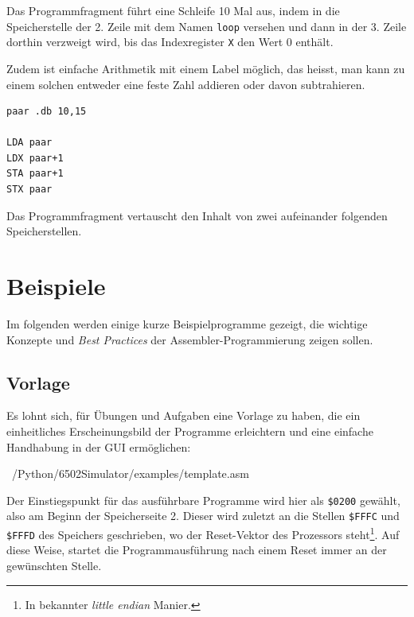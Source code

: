\documentclass[11pt]{scrartcl}
\newcommand{\hex}[1]{\texttt{\$#1}}
\begin{document}
\begin{center}
  
\end{center}

Das Programmfragment führt eine Schleife 10 Mal aus, indem in die
Speicherstelle der 2. Zeile mit dem Namen \lstinline!loop! versehen
und dann in der 3. Zeile dorthin verzweigt wird, bis das Indexregister
\lstinline!X! den Wert 0 enthält.

Zudem ist einfache Arithmetik mit einem Label möglich, das heisst, man
kann zu einem solchen entweder eine feste Zahl addieren oder davon
subtrahieren.


\begin{center}
\begin{lstlisting}[caption={Assembler, Beispiel 3}, label=asmbeisp3]
paar .db 10,15

LDA paar
LDX paar+1
STA paar+1
STX paar
\end{lstlisting}
\end{center}

Das Programmfragment vertauscht den Inhalt von zwei aufeinander
folgenden Speicherstellen.

\newpage
\section{Beispiele}
\label{sec:beispiele}

Im folgenden werden einige kurze Beispielprogramme gezeigt, die
wichtige Konzepte und \emph{Best Practices} der
Assembler-Programmierung zeigen sollen.

\subsection{Vorlage}
\label{sec:vorlage}

Es lohnt sich, für Übungen und Aufgaben eine Vorlage zu haben, die
ein einheitliches Erscheinungsbild der Programme erleichtern und eine
einfache Handhabung in der GUI ermöglichen:


{~/Python/6502Simulator/examples/template.asm}

Der Einstiegspunkt für das ausführbare Programme wird hier als
\hex{0200} gewählt, also am Beginn der Speicherseite 2. Dieser wird
zuletzt an die Stellen \hex{FFFC} und \hex{FFFD} des Speichers
geschrieben, wo der Reset-Vektor des Prozessors steht\footnote{In
  bekannter \emph{little endian} Manier.}. Auf diese Weise, startet
die Programmausführung nach einem Reset immer an der gewünschten
Stelle.
\end{document}
